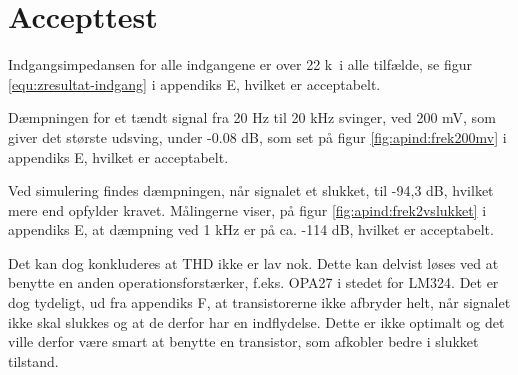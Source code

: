 \section{Accepttest}
Indgangsimpedansen for alle indgangene er over 22 k\ohm~i alle tilfælde, se figur \ref{equ:zresultat-indgang} i appendiks E, hvilket er acceptabelt. 

Dæmpningen for et tændt signal fra 20 Hz til 20 kHz svinger, ved 200 mV, som giver det største udsving, under -0.08 dB, som set på figur \ref{fig:apind:frek200mv} i appendiks E, hvilket er acceptabelt.

Ved simulering findes dæmpningen, når signalet et slukket, til -94,3 dB, hvilket mere end opfylder kravet.
Målingerne viser, på figur \ref{fig:apind:frek2vslukket} i appendiks E, at dæmpning ved 1 kHz er på ca. -114 dB, hvilket er acceptabelt.

Det kan dog konkluderes at THD ikke er lav nok. Dette kan delvist løses ved at benytte en anden operationsforstærker, f.eks. OPA27 i stedet for LM324. Det er dog tydeligt, ud fra appendiks F, at transistorerne ikke afbryder helt, når signalet ikke skal slukkes og at de derfor har en indflydelse. Dette er ikke optimalt og det ville derfor være smart at benytte en transistor, som afkobler bedre i slukket tilstand.